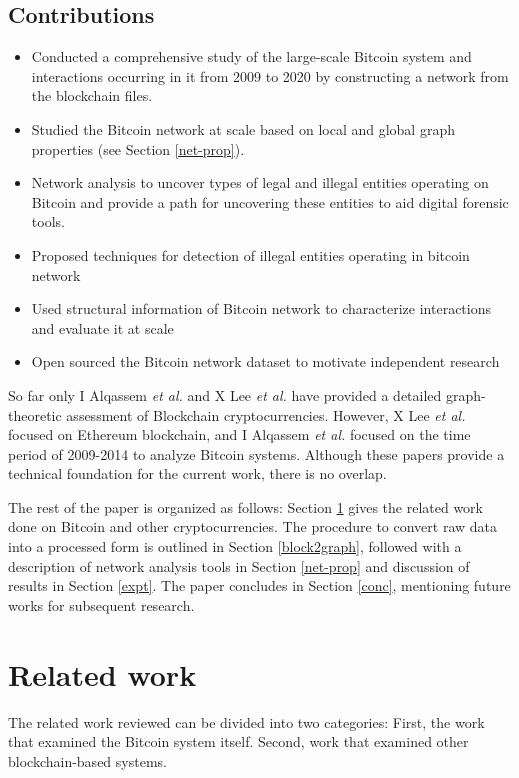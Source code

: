 \documentclass[preprint,12pt]{elsarticle}
\begin{document}
\subsection{Contributions}
\begin{itemize}
    \item Conducted a comprehensive study of the large-scale Bitcoin system and interactions occurring in it from 2009 to 2020 by constructing a network from the blockchain files.
    \item Studied the Bitcoin network at scale based on local and
global graph properties (see Section \ref{net-prop}). 
\item Network analysis to uncover types of legal and illegal entities operating on Bitcoin and provide a path for uncovering these entities to aid digital forensic tools.
\item Proposed techniques for detection of illegal entities operating in bitcoin network
\item Used structural information of Bitcoin network to characterize interactions and evaluate it at scale
\item Open sourced the Bitcoin network dataset to motivate independent research
\end{itemize}


So far only I Alqassem \textit{et al.} \cite{alqassem2018anti} and X Lee \textit{et al.} \cite{lee2019measurements} have provided a detailed graph-theoretic assessment of Blockchain cryptocurrencies. However, X Lee \textit{et al.} focused on Ethereum blockchain, and I Alqassem \textit{et al.} focused on the time period of 2009-2014 to analyze Bitcoin systems. Although these papers provide a technical foundation for the current work, there is no overlap.


The rest of the paper is organized as follows: Section \ref{related} gives the related work done on Bitcoin and other cryptocurrencies. The procedure to convert raw data into a processed form is outlined in Section \ref{block2graph}, followed with a description of network analysis tools in Section \ref{net-prop} and discussion of results in Section \ref{expt}. The paper concludes in Section \ref{conc}, mentioning future works for subsequent research.   



\section{Related work} \label{related}
The related work reviewed can be divided into two categories: First, the work that examined the Bitcoin system itself. Second, work that examined other blockchain-based systems. 
\end{document}

